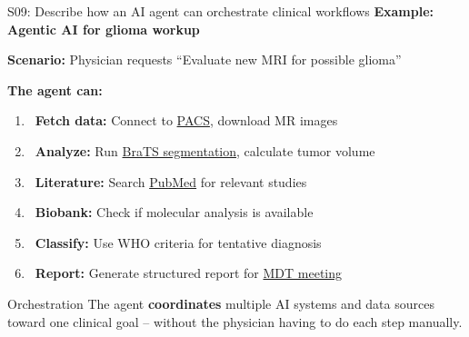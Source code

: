 \documentclass[aspectratio=169, 10pt]{beamer}
\begin{document}
\begin{frame}{S09: Describe how an AI agent can orchestrate clinical workflows}
    \textbf{Example: Agentic AI for glioma workup}
    
    \vspace{0.2cm}
    \textbf{Scenario:} Physician requests ``Evaluate new MRI for possible glioma''
    
    \vspace{0.2cm}
    \textbf{The agent can:}
    \begin{enumerate}
        \item \faSearch~\textbf{Fetch data:} Connect to \href{https://en.wikipedia.org/wiki/Picture_archiving_and_communication_system}{PACS}, download MR images
        \item \faBrain~\textbf{Analyze:} Run \href{https://www.synapse.org/brats}{BraTS segmentation}, calculate tumor volume
        \item \faBookMedical~\textbf{Literature:} Search \href{https://pubmed.ncbi.nlm.nih.gov/}{PubMed} for relevant studies
        \item \faDatabase~\textbf{Biobank:} Check if molecular analysis is available
        \item \faFile*~\textbf{Classify:} Use WHO criteria for tentative diagnosis
        \item \faClipboard~\textbf{Report:} Generate structured report for \href{https://en.wikipedia.org/wiki/Multidisciplinary_team}{MDT meeting}
    \end{enumerate}
    
    \vspace{0.1cm}
    {\small
    \begin{block}{Orchestration}
        The agent \textbf{coordinates} multiple AI systems and data sources toward one clinical goal -- without the physician having to do each step manually.
    \end{block}
    }
\end{frame}
\end{document}
